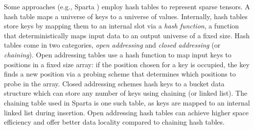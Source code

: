 
Some approaches (e.g., Sparta \cite{liu2021sparta}) employ hash tables to represent sparse tensors. A hash table
maps a universe of keys to a universe of values. Internally, hash tables store keys by mapping them to an internal slot via a \emph{hash function}, a function that deterministically maps input data to an output universe of a fixed size. Hash tables come in two categories, \textit{open addressing} and \textit{closed addressing} (or \emph{chaining}). Open addressing tables use a hash function to map input keys to positions in a fixed size array: if the position chosen for a key is occupied, the key finds a new position via a probing scheme that determines which positions to probe in the array. Closed addressing schemes hash keys to a bucket data structure which can store any number of keys using chaining (or linked list). The chaining table used in Sparta is one such table, as keys are mapped to an internal linked list during insertion.
Open addressing hash tables can achieve higher space efficiency and offer better data locality compared to chaining hash tables.

